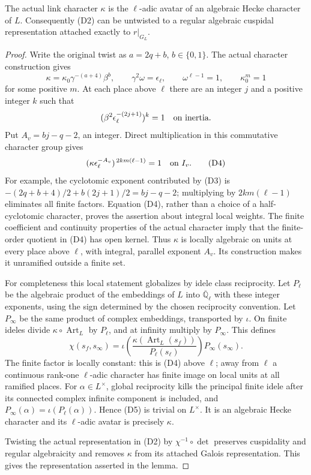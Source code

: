 \begin{srlemma}\label{lem:sr-link-character-algebraic}
The actual link character \(\kappa\) is the \(\ell\)-adic
avatar of an algebraic Hecke character of \(L\).
Consequently (D2) can be untwisted to a regular algebraic
cuspidal representation attached exactly to \(r|_{G_L}\).
\end{srlemma}
\begin{proof}
Write the original twist as \(a=2q+b\), \(b\in\{0,1\}\).
The actual character construction gives
\[
 \kappa=\kappa_0\gamma^{-(a+4)}\beta^b,\qquad
 \gamma^2\omega=\epsilon_\ell,\qquad \omega^{\ell-1}=1,
 \qquad \kappa_0^m=1
 \tag{D3}
\]
for some positive \(m\).
At each place above \(\ell\) there are an integer \(j\)
and a positive integer \(k\) such that
\[
                 (\beta^2\epsilon_\ell^{-(2j+1)})^k=1
                          \quad\hbox{on inertia}.
\]
Put \(A_v=bj-q-2\), an integer. Direct multiplication
in this commutative character group gives
\[
              (\kappa\epsilon_\ell^{-A_v})
                          ^{\,2km(\ell-1)}=1
                           \quad\hbox{on }I_v .
 \tag{D4}
\]
For example, the cyclotomic exponent contributed by (D3)
is \(-(2q+b+4)/2+b(2j+1)/2=bj-q-2\);
multiplying by \(2km(\ell-1)\) eliminates all finite factors.
Equation (D4), rather than a choice of a half-cyclotomic
character, proves the assertion about integral local
weights.
The finite coefficient and continuity properties of the
actual character imply that the finite-order quotient in
(D4) has open kernel.
Thus \(\kappa\) is locally algebraic on units at every
place above \(\ell\), with integral, parallel exponent \(A_v\).
Its construction makes it unramified outside a finite set.

For completeness this local statement globalizes by
idele class reciprocity.
Let \(P_\ell\) be the algebraic product of the embeddings
of \(L\) into \(\overline{\mathbb Q}_\ell\) with these
integer exponents, using the sign determined by the chosen
reciprocity convention. Let \(P_\infty\) be the same product
of complex embeddings, transported by \(\iota\).
On finite ideles divide \(\kappa\circ\operatorname{Art}_L\)
by \(P_\ell\), and at infinity multiply by \(P_\infty\).
This defines
\[
 \chi(s_f,s_\infty)=
 \iota\!\left(
   \frac{\kappa(\operatorname{Art}_L(s_f))}
                    {P_\ell(s_\ell)}\right)
                         P_\infty(s_\infty).
 \tag{D5}
\]
The finite factor is locally constant: this is (D4) above
\(\ell\); away from \(\ell\) a continuous rank-one
\(\ell\)-adic character has finite image on local units
at all ramified places.
For \(\alpha\in L^\times\), global reciprocity kills
the principal finite idele after its connected complex
infinite component is included, and
\(P_\infty(\alpha)=\iota(P_\ell(\alpha))\).
Hence (D5) is trivial on \(L^\times\).
It is an algebraic Hecke character and its \(\ell\)-adic
avatar is precisely \(\kappa\).

Twisting the actual representation in (D2) by
\(\chi^{-1}\circ\det\) preserves cuspidality and regular
algebraicity and removes \(\kappa\) from its attached
Galois representation.
This gives the representation asserted in the lemma.
\end{proof}

